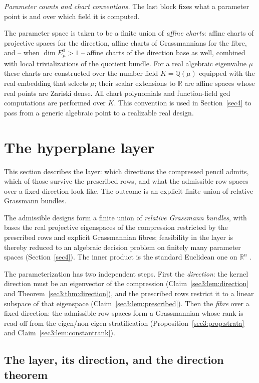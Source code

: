 \documentclass[journal]{IEEEtran}
\theoremstyle{plainn}
\theoremstyle{remark}
\begin{document}
\emph{Parameter counts and chart conventions.} The last block fixes what a parameter point is and over
which field it is computed.

The parameter space is taken to be a finite union of \emph{affine charts}: affine charts of projective
spaces for the direction, affine charts of Grassmannians for the fibre, and -- when
$\dim E_\mu^0>1$ -- affine charts of the direction base as well, combined with local trivializations of
the quotient bundle. For a real algebraic eigenvalue $\mu$ these charts are constructed over the number
field $K=\mathbb Q(\mu)$ equipped with the real embedding that selects $\mu$; their scalar extensions to
$\mathbb R$ are affine spaces whose real points are Zariski dense. All chart polynomials and
function-field gcd computations are performed over $K$. This convention is used in
Section~\ref{sec4} to pass from a generic algebraic point to a realizable real design.


\section{The hyperplane layer}\label{sec3}

This section describes the layer: which directions the compressed pencil admits, which of those
survive the prescribed rows, and what the admissible row spaces over a fixed direction look like. The
outcome is an explicit finite union of relative Grassmann bundles.

The admissible designs form a finite union of \emph{relative Grassmann bundles}, with bases the real
projective eigenspaces of the compression restricted by the prescribed rows and explicit Grassmannian
fibres; feasibility in the layer is thereby reduced to an algebraic decision problem on finitely many
parameter spaces (Section~\ref{sec4}). The inner product is the standard Euclidean one on
$\mathbb{R}^n$ \cite{hj13}.

The parameterization has two independent steps. First the \emph{direction}: the kernel direction must
be an eigenvector of the compression (Claim~\ref{sec3:lem:direction} and
Theorem~\ref{sec3:thm:direction}), and the prescribed rows restrict it to a linear subspace of that
eigenspace (Claim~\ref{sec3:lem:prescribed}). Then the \emph{fibre} over a fixed direction: the
admissible row spaces form a Grassmannian whose rank is read off from the eigen/non-eigen
stratification (Proposition~\ref{sec3:prop:strata} and Claim~\ref{sec3:lem:constantrank}).


\subsection{The layer, its direction, and the direction theorem}\label{sec3:sub:struct}\label{sec3:sub:direction}
\end{document}
